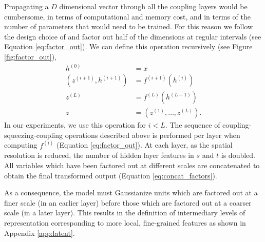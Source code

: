 \documentclass{article}
\newcommand{\jcom}[1]{\textcolor{darkgreen}{[jascha: #1]}}
\newcommand{\ldcom}[1]{\textcolor{blue}{[laurent: #1]}}
\begin{document}
Propagating a $D$ dimensional vector through all the coupling layers would be cumbersome, in terms of computational and memory cost, and in terms of the number of parameters that would need to be trained.
For this reason we follow the design choice of \citep{simonyan2014very} and factor out half of the dimensions at regular intervals (see Equation \ref{eq:factor_out}).
We can define this operation recursively (see Figure \ref{fig:factor_out}),
\begin{align}
h^{(0)} &= x \\
(z^{(i + 1)}, h^{(i + 1)}) &= f^{(i + 1)}(h^{(i)})
\label{eq:factor_out} \\
z^{(L)} &= f^{(L)}(h^{(L - 1)})
\label{eq:final_factor}\\
z &= (z^{(1)}, \dots, z^{(L)})
\label{eq:concat_factors}
.
\end{align}
In our experiments, we use this operation for $i < L$.
The sequence of coupling-squeezing-coupling operations described above is performed per layer when computing $f^{(i)}$ (Equation \ref{eq:factor_out}).
At each layer, as the spatial resolution is reduced, the number of hidden layer features in $s$ and $t$ is doubled.
All variables which have been factored out at different scales are concatenated to obtain the final transformed output (Equation \ref{eq:concat_factors}).

As a consequence, the model must Gaussianize units which are factored out at a finer scale (in an earlier layer) before those which are factored out at a coarser scale (in a later layer). This results in the definition of intermediary levels of representation \citep{salakhutdinov2009deep, rezende2014stochastic} corresponding to more local, fine-grained features as shown in Appendix \ref{app:latent}.
\end{document}
